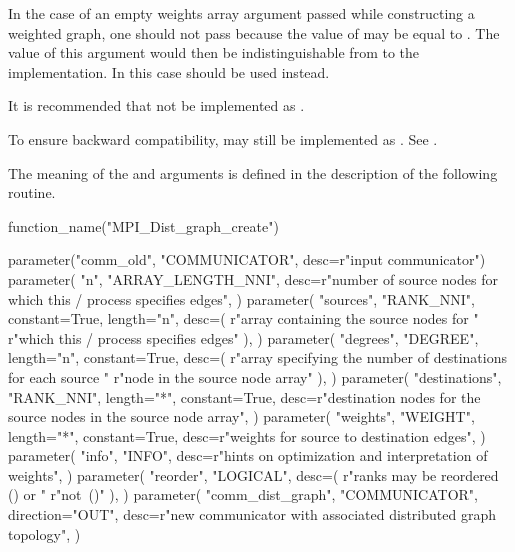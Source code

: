 \begin{users}
In the case of an empty weights array argument passed while constructing
a weighted graph, one should not pass  because the value of
 may be equal to . The value of this argument
would then be indistinguishable from  to the
implementation. In this case  should be used
instead.
\end{users}

\begin{implementors}
It is recommended that  not be implemented as
.
\end{implementors}

\begin{rationale}
To ensure backward compatibility,  may still be
implemented as . See .
\end{rationale}

The meaning of the  and  arguments is defined
in the description of the following routine.

\begin{mpi-binding}
    function_name("MPI_Dist_graph_create")
    
    parameter("comm_old", "COMMUNICATOR", desc=r"input communicator")
    parameter(
        "n",
        "ARRAY_LENGTH_NNI",
        desc=r"number of source nodes for which this \MPI/ process specifies edges",
    )
    parameter(
        "sources",
        "RANK_NNI",
        constant=True,
        length="n",
        desc=(
            r"array containing the  source nodes for "
            r"which this \MPI/ process specifies edges"
        ),
    )
    parameter(
        "degrees",
        "DEGREE",
        length="n",
        constant=True,
        desc=(
            r"array specifying the number of destinations for each source "
            r"node in the source node array"
        ),
    )
    parameter(
        "destinations",
        "RANK_NNI",
        length="*",
        constant=True,
        desc=r"destination nodes for the source nodes in the source node array",
    )
    parameter(
        "weights",
        "WEIGHT",
        length="*",
        constant=True,
        desc=r"weights for source to destination edges",
    )
    parameter(
        "info",
        "INFO",
        desc=r"hints on optimization and interpretation of weights",
    )
    parameter(
        "reorder",
        "LOGICAL",
        desc=(
            r"ranks may be reordered () or "
            r"not~(\mbox{})"
        ),
    )
    parameter(
        "comm_dist_graph",
        "COMMUNICATOR",
        direction="OUT",
        desc=r"new communicator with associated distributed graph topology",
    )
\end{mpi-binding}

